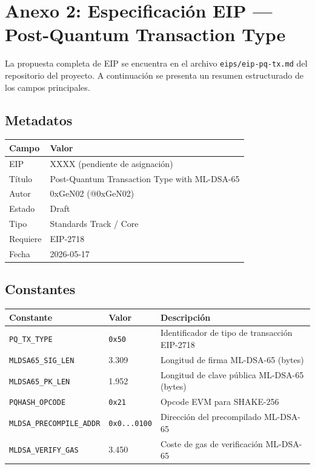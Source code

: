 \section{Anexo 2: Especificación EIP --- Post-Quantum Transaction Type}
\label{sec:anexo_eip}

La propuesta completa de EIP se encuentra en el archivo \texttt{eips/eip-pq-tx.md} del repositorio del proyecto. A continuación se presenta un resumen estructurado de los campos principales.

\subsection*{Metadatos}

\begin{tabular}{@{}ll@{}}
\toprule
\textbf{Campo} & \textbf{Valor} \\
\midrule
EIP & XXXX (pendiente de asignación) \\
Título & Post-Quantum Transaction Type with ML-DSA-65 \\
Autor & 0xGeN02 (@0xGeN02) \\
Estado & Draft \\
Tipo & Standards Track / Core \\
Requiere & EIP-2718 \\
Fecha & 2026-05-17 \\
\bottomrule
\end{tabular}

\subsection*{Constantes}

\begin{tabular}{@{}llL{7cm}@{}}
\toprule
\textbf{Constante} & \textbf{Valor} & \textbf{Descripción} \\
\midrule
\texttt{PQ\_TX\_TYPE} & \texttt{0x50} & Identificador de tipo de transacción EIP-2718 \\
\texttt{MLDSA65\_SIG\_LEN} & 3.309 & Longitud de firma ML-DSA-65 (bytes) \\
\texttt{MLDSA65\_PK\_LEN} & 1.952 & Longitud de clave pública ML-DSA-65 (bytes) \\
\texttt{PQHASH\_OPCODE} & \texttt{0x21} & Opcode EVM para SHAKE-256 \\
\texttt{MLDSA\_PRECOMPILE\_ADDR} & \texttt{0x0...0100} & Dirección del precompilado ML-DSA-65 \\
\texttt{MLDSA\_VERIFY\_GAS} & 3.450 & Coste de gas de verificación ML-DSA-65 \\
\bottomrule
\end{tabular}

